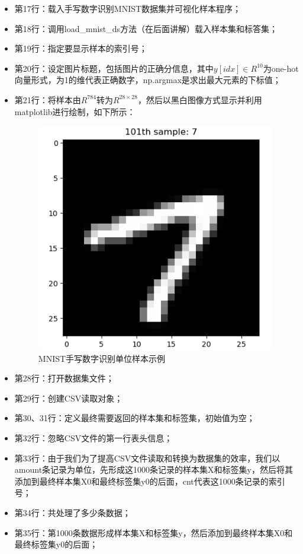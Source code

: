 \documentclass[UTF8]{article}
\begin{document}
\begin{itemize}
\item 第17行：载入手写数字识别MNIST数据集并可视化样本程序；
\item 第18行：调用load\_mnist\_ds方法（在后面讲解）载入样本集和标答集；
\item 第19行：指定要显示样本的索引号；
\item 第20行：设定图片标题，包括图片的正确分信息，其中$y[idx] \in R^{10}$为one-hot向量形式，为1的维代表正确数字，np.argmax是求出最大元素的下标值；
\item 第21行：将样本由$R^{784}$转为$R^{28 \times 28}$，然后以黑白图像方式显示并利用matplotlib进行绘制，如下所示：
\begin{figure}[H]
	\caption{MNIST手写数字识别单位样本示例}
	\label{f000031001}
	\centering
	\includegraphics[height=10cm]{images/f000031}
\end{figure}
\item 第28行：打开数据集文件；
\item 第29行：创建CSV读取对象；
\item 第30、31行：定义最终需要返回的样本集和标签集，初始值为空；
\item 第32行：忽略CSV文件的第一行表头信息；
\item 第33行：由于我们为了提高CSV文件读取和转换为数据集的效率，我们以amount条记录为单位，先形成这1000条记录的样本集X和标签集y，然后将其添加到最终样本集X0和最终标签集y0的后面，cnt代表这1000条记录的索引号；
\item 第34行：共处理了多少条数据；
\item 第35行：第1000条数据形成样本集X和标签集y，然后添加到最终样本集X0和最终标签集y0的后面；

\end{itemize}
\end{document}
